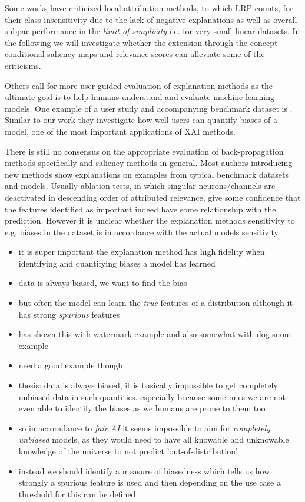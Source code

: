 Some works have criticized local attribution methods, to which LRP counts, for their class-insensitivity due to the lack of negative explanations as well as overall subpar performance in the \textit{limit of simplicity} i.e. for very small linear datasets. 
In the following we will investigate whether the extension through the concept conditional saliency maps and relevance scores can alleviate some of the criticisms.

Others call for more user-guided evaluation of explanation methods as the ultimate goal is to help humans understand and evaluate machine learning models. One example of a user study and accompanying benchmark dataset is \cite{Sixt2022}. Similar to our work they investigate how well users can quantify biases of a model, one of the most important applications of XAI methods. 

There is still no consensus on the appropriate evaluation of back-propagation methods specifically and saliency methods in general. Most authors introducing new methods show explanations on examples from typical benchmark datasets and models. Usually ablation tests, in which singular neurons/channels are deactivated in descending order of attributed relevance, give some confidence that the features identified as important indeed have some relationship with the prediction. However it is unclear whether the explanation methods sensitivity to e.g. biases in the dataset is in accordance with the actual models sensitivity. 

\begin{itemize}
    \item it is super important the explanation method has high fidelity when identifying and quantifying biases a model has learned
    \item data is always biased, we want to find the bias
    \item but often the model can learn the \textit{true} features of a distribution although it has strong \textit{spurious} features 
    \item \cite{Achtibat2022} has shown this with watermark example and also somewhat with dog snout example
    \item need a good example though
    \item thesis: data is always biased, it is basically impossible to get completely unbiased data in such quantities. especially because sometimes we are not even able to identify the biases as we humans are prone to them too
    \item so in accoradance to \textit{fair AI} it seems impossible to aim for \textit{completely unbiased} models, as they would need to have all knowable and unknowable knowledge of the universe to not predict 'out-of-distribution' 
    \item instead we should identify a measure of biasedness which tells us how strongly a spurious feature is used and then depending on the use case a threshold for this can be defined.
\end{itemize}

